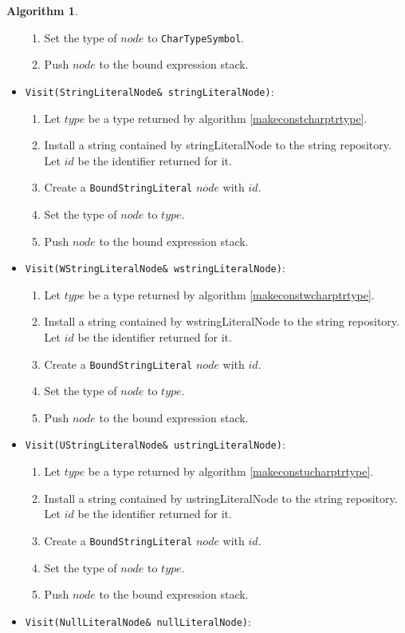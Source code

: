 \documentclass[a4paper,oneside,11pt]{book}
\theoremstyle{definition}
\newtheorem{algo}{Algorithm}[section]
\begin{document}
\begin{algo}
\begin{itemize}
\begin{enumerate}
\item
Set the type of $node$ to \verb|CharTypeSymbol|.
\item
Push $node$ to the bound expression stack.
\end{enumerate}
\item
\verb|Visit(StringLiteralNode& stringLiteralNode)|:
\begin{enumerate}
\item
Let $type$ be a type returned by algorithm \ref{makeconstcharptrtype}.
\item
Install a string contained by stringLiteralNode to the string repository. Let $id$ be the identifier returned for it.
\item
Create a \verb|BoundStringLiteral| $node$ with $id$.
\item
Set the type of $node$ to $type$.
\item
Push $node$ to the bound expression stack.
\end{enumerate}
\item
\verb|Visit(WStringLiteralNode& wstringLiteralNode)|:
\begin{enumerate}
\item
Let $type$ be a type returned by algorithm \ref{makeconstwcharptrtype}.
\item
Install a string contained by wstringLiteralNode to the string repository. Let $id$ be the identifier returned for it.
\item
Create a \verb|BoundStringLiteral| $node$ with $id$.
\item
Set the type of $node$ to $type$.
\item
Push $node$ to the bound expression stack.
\end{enumerate}
\item
\verb|Visit(UStringLiteralNode& ustringLiteralNode)|:
\begin{enumerate}
\item
Let $type$ be a type returned by algorithm \ref{makeconstucharptrtype}.
\item
Install a string contained by ustringLiteralNode to the string repository. Let $id$ be the identifier returned for it.
\item
Create a \verb|BoundStringLiteral| $node$ with $id$.
\item
Set the type of $node$ to $type$.
\item
Push $node$ to the bound expression stack.
\end{enumerate}
\item
\verb|Visit(NullLiteralNode& nullLiteralNode)|:

\end{itemize}
\end{algo}
\end{document}
